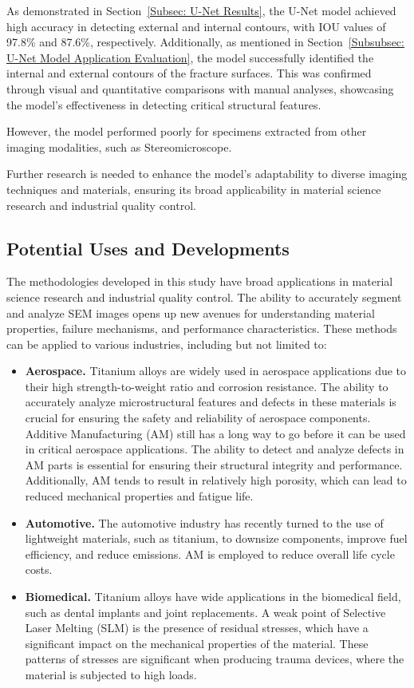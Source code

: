 \documentclass{ieeeaccess}
\begin{document}
As demonstrated in Section~\ref{Subsec: U-Net Results}, the U-Net model achieved high accuracy in detecting external and internal contours, with IOU values of 97.8\% and 87.6\%, respectively. Additionally, as mentioned in Section~\ref{Subsubsec: U-Net Model Application Evaluation}, the model successfully identified the internal and external contours of the fracture surfaces. This was confirmed through visual and quantitative comparisons with manual analyses, showcasing the model's effectiveness in detecting critical structural features.

However, the model performed poorly for specimens extracted from other imaging modalities, such as Stereomicroscope.

Further research is needed to enhance the model's adaptability to diverse imaging techniques and materials, ensuring its broad applicability in material science research and industrial quality control.


\subsection{Potential Uses and Developments}
\label{subsec:Potential Uses and Developments}
The methodologies developed in this study have broad applications in material science research and industrial quality control. The ability to accurately segment and analyze SEM images opens up new avenues for understanding material properties, failure mechanisms, and performance characteristics.
These methods can be applied to various industries, including but not limited to:

\begin{itemize}
    \item \textbf{Aerospace.} Titanium alloys are widely used in aerospace applications due to their high strength-to-weight ratio and corrosion resistance. The ability to accurately analyze microstructural features and defects in these materials is crucial for ensuring the safety and reliability of aerospace components. Additive Manufacturing (AM) still has a long way to go before it can be used in critical aerospace applications. The ability to detect and analyze defects in AM parts is essential for ensuring their structural integrity and performance. Additionally, AM tends to result in relatively high porosity, which can lead to reduced mechanical properties and fatigue life. ~\cite{montanari2023additive}
    \item \textbf{Automotive.} The automotive industry has recently turned to the use of lightweight materials, such as titanium, to downsize components, improve fuel efficiency, and reduce emissions. AM is employed to reduce overall life cycle costs.~\cite{nyamekye2023impact}
    \item \textbf{Biomedical.} Titanium alloys have wide applications in the biomedical field, such as dental implants and joint replacements. A weak point of Selective Laser Melting (SLM) is the presence of residual stresses, which have a significant impact on the mechanical properties of the material. These patterns of stresses are significant when producing trauma devices, where the material is subjected to high loads.~\cite{marin2023biomedical}
\end{itemize}
\end{document}

